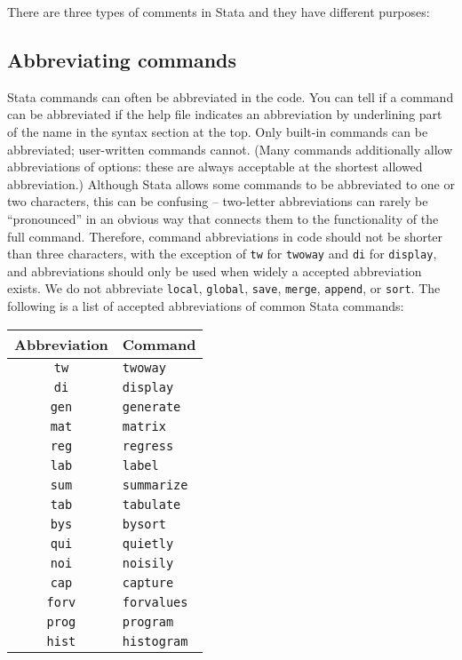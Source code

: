 There are three types of comments in Stata and they have different purposes:


\subsection*{Abbreviating commands}

Stata commands can often be abbreviated in the code.
You can tell if a command can be abbreviated if the help file indicates an abbreviation by underlining part of the name in the syntax section at the top.
Only built-in commands can be abbreviated; user-written commands cannot.
(Many commands additionally allow abbreviations of options:
these are always acceptable at the shortest allowed abbreviation.)
Although Stata allows some commands to be abbreviated to one or two characters,
this can be confusing -- two-letter abbreviations can rarely be ``pronounced''
in an obvious way that connects them to the functionality of the full command.
Therefore, command abbreviations in code should not be shorter than three characters,
with the exception of \texttt{tw} for \texttt{twoway} and \texttt{di} for \texttt{display},
and abbreviations should only be used when widely a accepted abbreviation exists.
We do not abbreviate \texttt{local}, \texttt{global}, \texttt{save}, \texttt{merge}, \texttt{append}, or \texttt{sort}.
The following is a list of accepted abbreviations of common Stata commands:

\begin{center}
	\begin{tabular}{ c | l }
    Abbreviation & Command \\
		\hline
		\texttt{tw} & \texttt{twoway} \\
		\texttt{di} & \texttt{display} \\
		\texttt{gen} & \texttt{generate} \\
		\texttt{mat} & \texttt{matrix} \\
		\texttt{reg} & \texttt{regress} \\
		\texttt{lab} & \texttt{label} \\
		\texttt{sum} & \texttt{summarize} \\
		\texttt{tab} & \texttt{tabulate} \\
		\texttt{bys} & \texttt{bysort} \\
		\texttt{qui} & \texttt{quietly} \\
		\texttt{noi} & \texttt{noisily} \\
		\texttt{cap} & \texttt{capture} \\
		\texttt{forv} & \texttt{forvalues} \\
		\texttt{prog} & \texttt{program} \\
		\texttt{hist} & \texttt{histogram} \\
		\hline
	\end{tabular}
\end{center}

